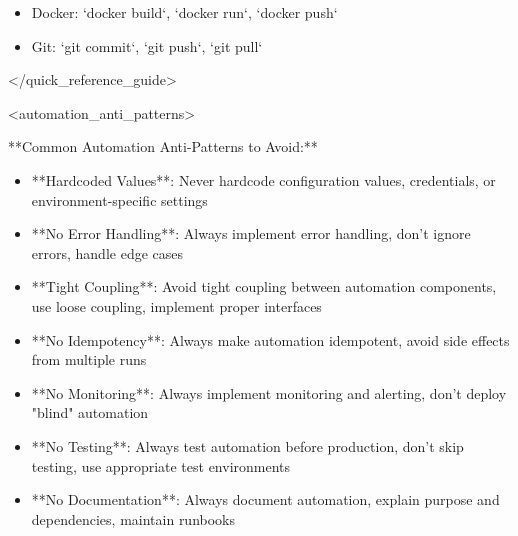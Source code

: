 \documentclass[11pt,a4paper]{article}
\begin{document}
\begin{itemize}
\item Docker: `docker build`, `docker run`, `docker push`
\end{itemize}

\begin{itemize}
\item Git: `git commit`, `git push`, `git pull`
\end{itemize}

</quick\_reference\_guide>

<automation\_anti\_patterns>

**Common Automation Anti-Patterns to Avoid:**

\begin{itemize}
\item **Hardcoded Values**: Never hardcode configuration values, credentials, or environment-specific settings
\end{itemize}

\begin{itemize}
\item **No Error Handling**: Always implement error handling, don't ignore errors, handle edge cases
\end{itemize}

\begin{itemize}
\item **Tight Coupling**: Avoid tight coupling between automation components, use loose coupling, implement proper interfaces
\end{itemize}

\begin{itemize}
\item **No Idempotency**: Always make automation idempotent, avoid side effects from multiple runs
\end{itemize}

\begin{itemize}
\item **No Monitoring**: Always implement monitoring and alerting, don't deploy "blind" automation
\end{itemize}

\begin{itemize}
\item **No Testing**: Always test automation before production, don't skip testing, use appropriate test environments
\end{itemize}

\begin{itemize}
\item **No Documentation**: Always document automation, explain purpose and dependencies, maintain runbooks
\end{itemize}
\end{document}
